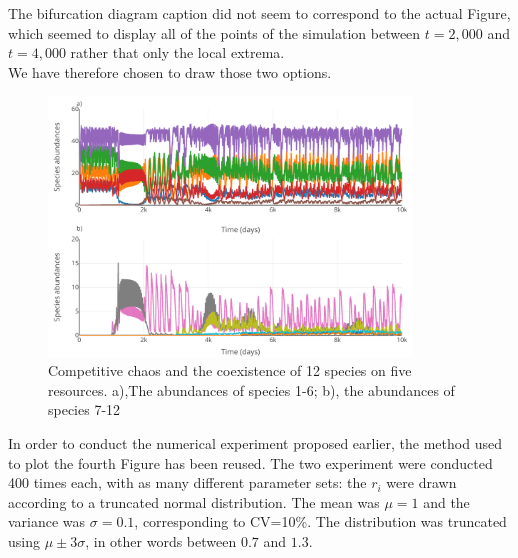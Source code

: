The bifurcation diagram caption did not seem to correspond to the actual 
Figure, which seemed to display all of the points of the simulation between 
$t=2,000$ and $t=4,000$ rather that only the local extrema.\\
We have therefore chosen to draw those two options. 
\begin{figure}[H]
\begin{center} 
 \includegraphics[width=0.86\textwidth]{../Code/Figures/Figure_4.pdf}
  \caption{Competitive chaos and the coexistence of 12 species on five 
resources. a),The abundances of species 1-6; b), the abundances of species 7-12}
  \label{figures:Fig4}
\end{center}
  \end{figure}
In order to conduct the numerical experiment proposed earlier, the method used to plot the 
fourth Figure has been reused. The two experiment were conducted 400 times each, 
with as many different parameter sets: the $r_i$ were drawn according to a 
truncated normal distribution. The mean was $\mu=1$ and the variance was 
$\sigma=0.1$, corresponding to CV=10\%. The distribution was truncated using $\mu\pm3\sigma$, in other 
words between $0.7$ and $1.3$.\\~\\


